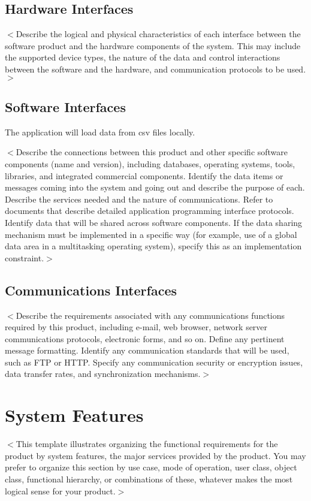\documentclass{report}
\begin{document}
\section{Hardware Interfaces}
$<$Describe the logical and physical characteristics of each interface between
the software product and the hardware components of the system. This may include
the supported device types, the nature of the data and control interactions
between the software and the hardware, and communication protocols to be
used.$>$

\section{Software Interfaces}
The application will load data from csv files locally.

$<$Describe the connections between this product and other specific software
components (name and version), including databases, operating systems, tools,
libraries, and integrated commercial components. Identify the data items or
messages coming into the system and going out and describe the purpose of each.
Describe the services needed and the nature of communications. Refer to
documents that describe detailed application programming interface protocols.
Identify data that will be shared across software components. If the data
sharing mechanism must be implemented in a specific way (for example, use of a
global data area in a multitasking operating system), specify this as an
implementation constraint.$>$

\section{Communications Interfaces}
$<$Describe the requirements associated with any communications functions
required by this product, including e-mail, web browser, network server
communications protocols, electronic forms, and so on. Define any pertinent
message formatting. Identify any communication standards that will be used, such
as FTP or HTTP. Specify any communication security or encryption issues, data
transfer rates, and synchronization mechanisms.$>$


\chapter{System Features}
$<$This template illustrates organizing the functional requirements for the
product by system features, the major services provided by the product. You may
prefer to organize this section by use case, mode of operation, user class,
object class, functional hierarchy, or combinations of these, whatever makes the
most logical sense for your product.$>$
\end{document}
